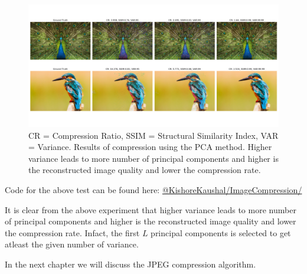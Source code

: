 \begin{figure}[!ht]
    \centering
    \includegraphics[width=1\textwidth]{fig/2-4.png}
    \caption{ CR = Compression Ratio, SSIM = Structural Similarity Index, VAR = Variance. Results of compression using the PCA method. Higher variance leads to more number of principal components and higher is the reconstructed image quality and lower the compression rate.}
    \label{fig:imageCompressionUsingPCA}
\end{figure}

Code for the above test can be found here: \href{https://github.com/KishoreKaushal/ImageCompression/tree/master/PCA}{@KishoreKaushal/ImageCompression/}

It is clear from the above experiment that higher variance leads to more number of principal components and higher is the reconstructed image quality and lower the compression rate. Infact, the first $L$ principal components is selected to get atleast the given number of variance.

In the next chapter we will discuss the JPEG compression algorithm.